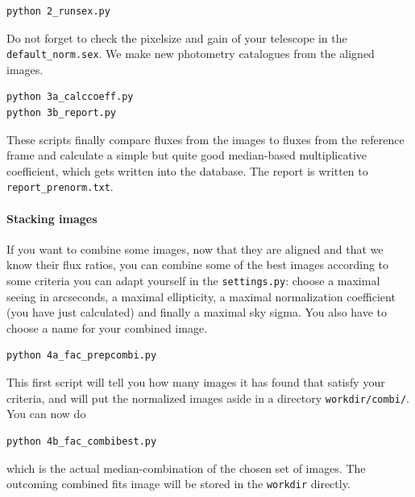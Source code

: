 \begin{Verbatim}
python 2_runsex.py
\end{Verbatim}
Do not forget to check the pixelsize and gain of your telescope in the \verb+default_norm.sex+. We make new photometry catalogues from the aligned images.

\begin{Verbatim}
python 3a_calccoeff.py
python 3b_report.py
\end{Verbatim}
These scripts finally compare fluxes from the images to fluxes from the reference frame and calculate a simple but quite good median-based multiplicative coefficient, which gets written into the database. The report is written to \verb+report_prenorm.txt+.



\paragraph{Stacking images}

If you want to combine some images, now that they are aligned and that we know their flux ratios, you can combine some of the best images according to some criteria you can adapt yourself in the \verb+settings.py+: choose a maximal seeing in arcseconds, a maximal ellipticity, a maximal normalization coefficient (you have just calculated) and finally a maximal sky sigma. You also have to choose a name for your combined image.

\begin{Verbatim}
python 4a_fac_prepcombi.py
\end{Verbatim}
This first script will tell you how many images it has found that satisfy your criteria, and will put the normalized images aside in a directory \verb+workdir/combi/+. You can now do

\begin{Verbatim}
python 4b_fac_combibest.py
\end{Verbatim}
which is the actual median-combination of the chosen set of images. The outcoming combined fits image will be stored in the \verb+workdir+ directly.

